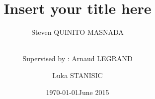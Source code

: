 \documentclass[smallextended]{svjour3}
\date{\today}
\title{}
\begin{document}
\newcommand{\AL}[2][inline]{\todo[color=green!50,#1]{\sf \textbf{AL:} #2}\xspace}
\newcommand{\LS}[2][inline]{\todo[color=green!50,#1]{\sf \textbf{LS:} #2}\xspace}

\let\oldcite=\cite
\renewcommand\cite[2][]{~\ifthenelse{\equal{#1}{}}{\oldcite{#2}}{\oldcite[#1]{#2}}\xspace}
\let\oldref=\ref
\def\ref#1{~\oldref{#1}\xspace}
\def\ie{i.e.,\xspace}
\def\eg{e.g.,\xspace}
\def\qrmspu{\texttt{QRM\_StarPU}\xspace}
\sloppy

\title{Insert your title here%
}


\author{Steven QUINITO MASNADA  \\ \and \\
        Supervised by : Arnaud LEGRAND \and Luka STANISIC  %
}



\date{June 2015}

\maketitle
\end{document}
